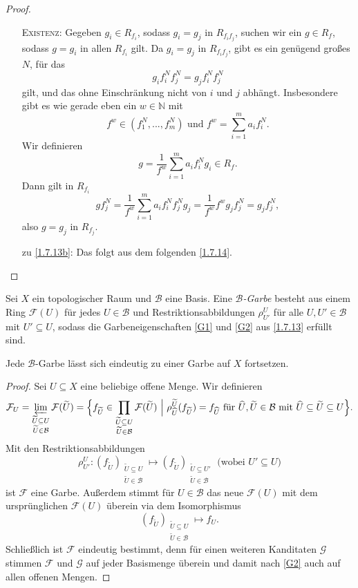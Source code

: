 \documentclass[a4paper,12pt,index=toc]{scrbook}
\theoremstyle{keinenummern} %
\def\B{\mathcal{B}}
\newcommand{\F}{\mathcal{F}}
\def\G{\mathcal{G}}
\renewcommand{\dotsc}{\ensuremath{\!...}}
\newcommand{\schlange}[1]{\widetilde{#1}}
\newcommand{\set}[1]{\ensuremath{\mathbb{#1}}}
\newcommand{\N}{\set{N}}
\newcommand{\dach}{\widehat}
\begin{document}
\begin{proof}
\begin{enumerate}
    \textsc{Existenz}: Gegeben $g_i\in R_{f_i}$, sodass $g_i=g_j$ in $R_{f_if_j}$, suchen wir ein $g\in R_f$, sodass $g=g_i$ in
    allen $R_{f_i}$ gilt. Da $g_i=g_j$ in $R_{f_if_j}$, gibt es ein genügend großes $N$, für das \[g_if_i^Nf_j^N=g_jf_i^Nf_j^N\] gilt,
    und das ohne Einschränkung nicht von $i$ und $j$ abhängt. Insbesondere gibt es wie gerade eben ein $w\in\N$ mit
    \[f^w\in(f_1^N,\dotsc,f_m^N)\text{ und }f^w=\sum_{i=1}^ma_if_i^N.\] 
    Wir definieren 
    \[g=\frac{1}{f^w}\sum_{i=1}^ma_if_i^Ng_i\in R_f.\] 
    Dann gilt in $R_{f_i}$
    \[ gf_j^N=\frac{1}{f^w}\sum_{i=1}^ma_if_i^Nf_j^Ng_j=\frac{1}{f^w}f^wg_jf_j^N=g_jf_j^N, \]
    also $g=g_j$ in $R_{f_j}$.
  \item [zu] \ref{1.7.13b}: Das folgt aus dem folgenden \cref{1.7.14}.
  \end{enumerate}
\end{proof}

\begin{lem}\label{1.7.14}
  Sei $X$ ein topologischer Raum und $\B$ eine Basis. Eine \emph{$\B$-Garbe\index{$\B$-Garbe}} besteht aus einem Ring
  $\F(U)$ für jedes $U\in\B$ und Restriktionsabbildungen $\rho_{U'}^U$ für alle $U,U'\in\B$ mit
  $U'\subseteq U$, sodass die Garbeneigenschaften \ref{G1} und \ref{G2} aus \cref{1.7.13} erfüllt sind.

  Jede $\B$-Garbe lässt sich eindeutig zu einer Garbe auf $X$ fortsetzen.
\end{lem}
\begin{proof}
  Sei $U\subseteq X$ eine beliebige offene Menge. Wir definieren
  \[ \F_U = \varprojlim_{\substack{\schlange{U}\subseteq U\\\schlange{U}\in\B}}\F(\schlange{U}) =
     \Bigl\{f_{\schlange{U}}\in\prod_{\substack{\schlange{U}\subseteq U\\\schlange{U}\in\B}}\F(\schlange{U}) \ \Big|\ 
     \rho_{\dach{U}}^{\schlange{U}}(f_{\schlange{U}})=f_{\dach{U}}\text{ für }
     \dach{U},\schlange{U}\in\B \text{ mit } \dach{U}\subseteq\schlange{U}\subseteq U \Bigr\}. \]
     Mit den Restriktionsabbildungen
     \[\rho_{U'}^U\colon (f_{\schlange{U}})_{\substack{\schlange{U}\subseteq U\\\schlange{U}\in\B}} \mapsto
     (f_{\schlange{U}})_{\substack{\schlange{U}\subseteq U'\\\schlange{U}\in\B}} \text{ (wobei $U'\subseteq U$)}\] 
     ist $\F$ eine
     Garbe. Außerdem stimmt für $U\in\B$ das neue $\F(U)$ mit dem ursprünglichen $\F(U)$ überein via
     dem Isomorphismus 
     \[(f_{\schlange{U}})_{\substack{\schlange{U}\subseteq U\\\schlange{U}\in\B}} \mapsto f_U.\]
     Schließlich ist $\F$ eindeutig bestimmt, denn für einen weiteren Kanditaten $\G$ stimmen $\F$
     und $\G$ auf jeder Basismenge überein und damit nach \ref{G2} auch auf allen offenen Mengen.
\end{proof}
\end{document}

